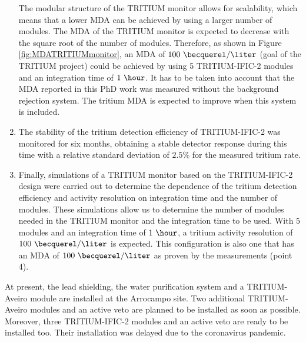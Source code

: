 \begin{enumerate}
The modular structure of the TRITIUM monitor allows for scalability, which means that a lower MDA can be achieved by using a larger number of modules. The MDA of the TRITIUM monitor is expected to decrease with the square root of the number of modules. Therefore, as shown in Figure \ref{fig:MDATRITIUMmonitor}, an MDA of  $100~\becquerel/\liter$ (goal of the TRITIUM project) could be achieved by using 5 TRITIUM-IFIC-2 modules and an integration time of $1~\hour$. It has to be taken into account that the MDA reported in this PhD work was measured without the background rejection system. The tritium MDA is expected to improve when this system is included.

\item{} The stability of the tritium detection efficiency of TRITIUM-IFIC-2 was monitored for six months, obtaining a stable detector response during this time with a relative standard deviation of $2.5\%$ for the measured tritium rate. 

\item{} Finally, simulations of a TRITIUM monitor based on the TRITIUM-IFIC-2 design were carried out to determine the dependence of the tritium detection efficiency and activity resolution on integration time and the number of modules. These simulations allow us to determine the number of modules needed in the TRITIUM monitor and the integration time to be used. With $5$ modules and an integration time of $1~\hour$, a tritium activity resolution of $100~\becquerel/\liter$ is expected. This configuration is also one that has an MDA of $100~\becquerel/\liter$ as proven by the measurements (point 4).

\end{enumerate}

At present, the lead shielding, the water purification system and a TRITIUM-Aveiro module are installed at the Arrocampo site. Two additional TRITIUM-Aveiro modules and an active veto are planned to be installed as soon as possible. Moreover, three TRITIUM-IFIC-2 modules and an active veto are ready to be installed too. Their installation was delayed due to the coronavirus pandemic.